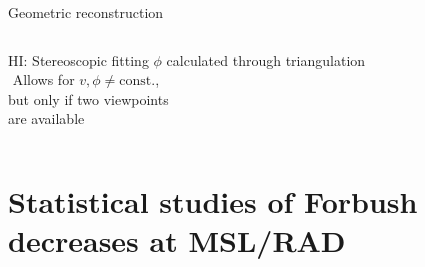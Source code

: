 \documentclass[10pt,aspectratio=169,usenames,dvipsnames]{beamer}
\newcommand{\textarrowfootnotesize}{\,{\scriptsize\faLongArrowAltRight}\,}
\begin{document}
\begin{frame}{Geometric reconstruction}
\begin{columns}[t]
\begin{column}{0.32\textwidth}
\begin{block}{HI: Stereoscopic fitting}
            {\footnotesize $\phi$ calculated through triangulation}\\[4mm]
            
            {\footnotesize \textarrowfootnotesize Allows for $v, \phi \neq \text{const.}$,\\ but only if two viewpoints\\[-1.25mm] are available}
            \vskip4mm
            \end{block}
        \end{column}
    \end{columns}
\end{frame}

\section{Statistical studies of Forbush decreases at MSL/RAD}
\end{document}
